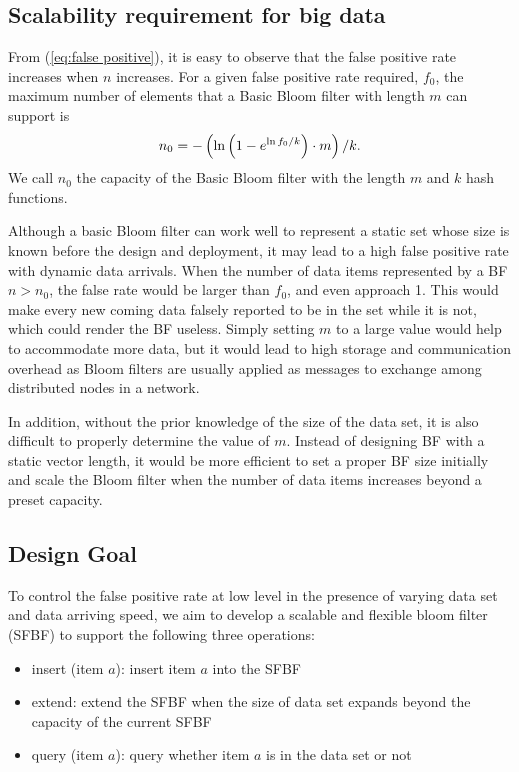 \documentclass[10pt,journal,letterpaper]{IEEEtran}
\begin{document}
\subsection{Scalability requirement for big data}
\label{subsec:Scalable bloom filter design for dynamic MCCS}
From (\ref{eq:false positive}), it is easy to observe that the false positive rate increases when $n$ increases.
For a given false positive rate required, $f_0$, the maximum number of elements that a Basic Bloom filter with length $m$ can support is
\begin{equation}
\footnotesize
{n_0} =  - \left( {\ln \left( {1 - {e^{\ln {f_0}/k}}} \right) \cdot m} \right)/k.
\label{eq:n_0 calculation}
\end{equation}
We call ${n_0}$ the capacity of the Basic Bloom filter with the length $m$ and $k$ hash functions.

Although a basic Bloom filter can work well to represent a static set whose size is known before the design and deployment, it may lead to a high false positive rate with dynamic data arrivals. When the number of data items represented by a BF $n > n_0$, the false rate would be larger than $f_0$, and even approach 1. This would make every new coming data falsely reported to be in the set while it is not, which could render the BF useless. Simply setting $m$ to a large value would help to accommodate more data, but it would lead to high storage and communication overhead  as Bloom filters are usually applied as messages to exchange among distributed nodes in a network.

In addition, without the prior knowledge of the size of the data set, it is also difficult to properly determine the value of $m$.
Instead of designing BF with a static vector length, it would be more efficient to set a proper BF size initially and scale the Bloom filter when the number of data items increases beyond a preset capacity.

\subsection{Design Goal}
To control the false positive rate at low level in the presence of varying data set and data arriving speed,  we aim to develop a scalable and flexible bloom filter (SFBF) to support the following three operations:
\begin{itemize}
  \item insert (item $a$): insert item $a$ into the SFBF
  \item extend: extend the SFBF when the size of data set expands beyond the capacity of the current SFBF
  \item query (item $a$): query whether item $a$ is in the data set or not
\end{itemize}
\end{document}
